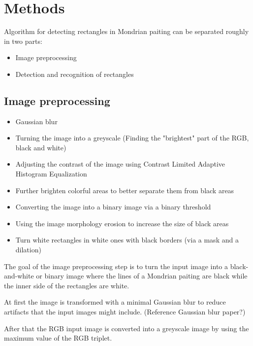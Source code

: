 \section{Methods}


Algorithm for detecting rectangles in Mondrian paiting can be separated roughly
in two parts:
\begin{itemize}
  \item Image preprocessing
  \item Detection and recognition of rectangles
\end{itemize}

\subsection{Image preprocessing}

\begin{itemize}
  \item Gaussian blur
  \item Turning the image into a greyscale (Finding the "brightest" part of the RGB, black and white)
  \item Adjusting the contrast of the image using Contrast Limited Adaptive Histogram Equalization
  \item Further brighten colorful areas to better separate them from black areas
  \item Converting the image into a binary image via a binary threshold
  \item Using the image morphology erosion to increase the size of black areas
  \item Turn white rectangles in white ones with black borders (via a mask and a dilation)
\end{itemize}

The goal of the image preprocessing step is to turn the input image into a
black-and-white or binary image where the lines of a Mondrian paiting are black
while the inner side of the rectangles are white.

At first the image is transformed with a minimal Gaussian blur to reduce
artifacts that the input images might include. (Reference Gaussian blur paper?)

After that the RGB input image is converted into a greyscale image by using the
maximum value of the RGB triplet.

